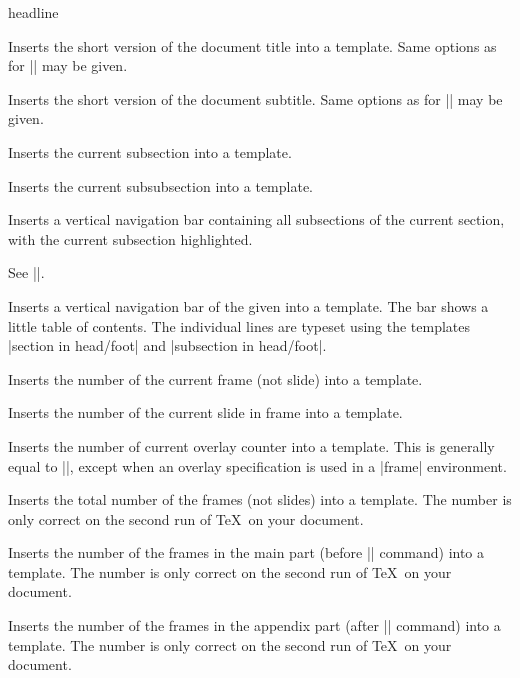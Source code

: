 \begin{element}{headline}
\begin{itemize}
    \iteminsert{\insertshorttitle}
    Inserts the short version of the document title into a template. Same options as for |\insertshortauthor| may be given.

    \iteminsert{\insertshortsubtitle}
    Inserts the short version of the document subtitle. Same options as for |\insertshortauthor| may be given.

    \iteminsert{\insertsubsection}
    Inserts the current subsection into a template.

    \iteminsert{\insertsubsubsection}
    Inserts the current subsubsection into a template.

    \iteminsert{\insertsubsectionnavigation}
    Inserts a vertical navigation bar containing all subsections of the current section, with the current subsection highlighted.

    \iteminsert{\insertsubsectionnavigationhorizontal}\newline
    See |\insertsectionnavigationhorizontal|.

    \iteminsert{\insertverticalnavigation}
    Inserts a vertical navigation bar of the given  into a template. The bar shows a little table of contents. The individual lines are typeset using the templates |section in head/foot| and |subsection in head/foot|.

    \iteminsert{\insertframenumber}
    Inserts the number of the current frame (not slide) into a template.

    \iteminsert{\insertslidenumber}
    Inserts the number of the current slide in frame into a template.

    \iteminsert{\insertoverlaynumber}
    Inserts the number of current overlay counter into a template. This is generally equal to |\insertslidenumber|, except when an overlay specification is used in a |frame| environment.

    \iteminsert{\inserttotalframenumber}
    Inserts the total number of the frames (not slides) into a template. The number is only correct on the second run of \TeX\ on your document.

    \iteminsert{\insertmainframenumber}
    Inserts the number of the frames in the main part (before |\appendix| command) into a template. The number is only correct on the second run of \TeX\ on your document.

    \iteminsert{\insertappendixframenumber}
    Inserts the number of the frames in the appendix part (after |\appendix| command) into a template. The number is only correct on the second run of \TeX\ on your document.


\end{itemize}
\end{element}

